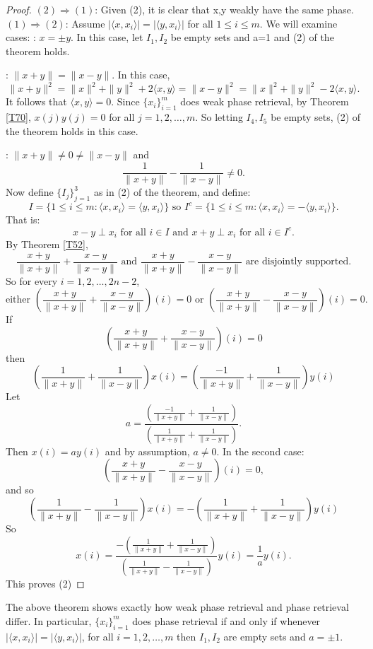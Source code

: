 \begin{proof} $(2)\Rightarrow (1)$: Given (2), it is clear that x,y weakly have the same phase.
 \vskip7pt
 $(1)\Rightarrow (2)$: Assume $|\langle x,x_i\rangle|=|\langle y,x_i\rangle|$ for all
 $1\le i \le m$. We will examine cases:
 \vskip7pt
 : $x=\pm y$. In this case, let $I_1,I_2$ be empty sets and a=1 and (2) of
 the theorem holds.
 
 
 \vskip7pt
 
 : $\|x+y\|=\|x-y\|$. In this case,
\[
 \|x+y\|^2= \|x\|^2+\|y\|^2+2\langle x,y\rangle
 = \|x-y\|^2
 = \|x\|^2+\|y\|^2-2\langle x,y\rangle.
\]
It follows that $\langle x,y\rangle =0$. Since $\{x_i\}_{i=1}^m$ does weak phase retrieval, by Theorem \ref{T70},
$x(j)y(j)=0$ for all $j=1,2,\ldots,m$. So letting $I_4,I_5$ be empty sets, (2) of the theorem holds in this case. 
 \vskip7pt
 
 : $\|x+y\|\not= 0 \not= \|x-y\|$ and 
 \[ \frac{1}{\|x+y\|}-\frac{1}{\|x-y\|} \not= 0.\]
 Now define $\{I_j\}_{j=1}^3$ as in (2) of the theorem, and define:
 \[ I=\{1\le i\le m:\langle x,x_i\rangle =\langle y,x_i\rangle\}\mbox{ so }I^c=\{1\le i\le m:\langle x,x_i\rangle = -\langle y,x_i\rangle\}.\]
 That is:
 \[ x-y\perp x_i\mbox{ for all }i\in I \mbox{ and }x+y\perp x_i\mbox{ for all }i\in I^c.\]
 By Theorem \ref{T52},
 \[ \frac{x+y}{\|x+y\|}+\frac{x-y}{\|x-y\|}\mbox{ and } \frac{x+y}{\|x+y\|}-\frac{x-y}{\|x-y\|}\mbox{ are disjointly supported}.\]
So for every $i=1,2,\ldots,2n-2$,
\[ \mbox{either }(\frac{x+y}{\|x+y\|}+\frac{x-y}{\|x-y\|})(i)=0\mbox{ or } (\frac{x+y}{\|x+y\|}-\frac{x-y}{\|x-y\|})(i)=0.\]
If
\[ (\frac{x+y}{\|x+y\|}+\frac{x-y}{\|x-y\|})(i)=0
\]
then
\[ \left ( \frac{1}{\|x+y\|}+\frac{1}{\|x-y\|}\right )x(i)=\left ( \frac{-1}{\|x+y\|}+\frac{1}{\|x-y\|}\right )y(i)
\]
Let
\[ a=\frac{\left ( \frac{-1}{\|x+y\|}+\frac{1}{\|x-y\|}\right )}{\left ( \frac{1}{\|x+y\|}+\frac{1}{\|x-y\|}\right )}.\]
Then $x(i)=ay(i)$ and by assumption, $a\not= 0$. In the second case:
\[ (\frac{x+y}{\|x+y\|}-\frac{x-y}{\|x-y\|})(i)=0,\]
and so
\[ \left ( \frac{1}{\|x+y\|}-\frac{1}{\|x-y\|}\right )x(i)=-\left ( \frac{1}{\|x+y\|}+\frac{1}{\|x-y\|}\right )y(i)
\]
So
\[ x(i) = \frac{-\left ( \frac{1}{\|x+y\|}+\frac{1}{\|x-y\|}\right )}{\left ( \frac{1}{\|x+y\|}-\frac{1}{\|x-y\|}\right )}y(i)=\frac{1}{a}y(i).\]
This proves (2)

\end{proof}

\begin{remark}
The above theorem shows exactly how weak phase retrieval and phase retrieval differ. In particular,
$\{x_i\}_{i=1}^m$ does phase retrieval if and only if whenever $|\langle x,x_i\rangle|=|\langle y,x_i\rangle|$,
for all $i=1,2,\ldots,m$ then $I_1,I_2$ are empty sets and $a=\pm 1$.
\end{remark}

